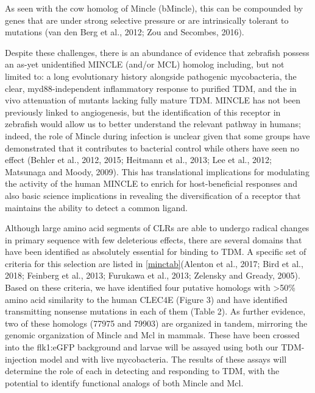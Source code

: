 As seen with the cow homolog of Mincle (bMincle), this can be compounded by genes that are under strong selective pressure or are intrinsically tolerant to mutations (van den Berg et al., 2012; Zou and Secombes, 2016). 

Despite these challenges, there is an abundance of evidence that zebrafish possess an as-yet unidentified MINCLE (and/or MCL) homolog including, but not limited to: a long evolutionary history alongside pathogenic mycobacteria, the clear, myd88-independent inflammatory response to purified TDM, and the in vivo attenuation of mutants lacking fully mature TDM. MINCLE has not been previously linked to angiogenesis, but the identification of this receptor in zebrafish would allow us to better understand the relevant pathway in humans; indeed, the role of Mincle during infection is unclear given that some groups have demonstrated that it contributes to bacterial control while others have seen no effect (Behler et al., 2012, 2015; Heitmann et al., 2013; Lee et al., 2012; Matsunaga and Moody, 2009). This has translational implications for modulating the activity of the human MINCLE to enrich for host-beneficial responses and also basic science implications in revealing the diversification of a receptor that maintains the ability to detect a common ligand. 

Although large amino acid segments of CLRs are able to undergo radical changes in primary sequence with few deleterious effects, there are several domains that have been identified as absolutely essential for binding to TDM. A specific set of criteria for this selection are listed in \autoref{minctab}(Alenton et al., 2017; Bird et al., 2018; Feinberg et al., 2013; Furukawa et al., 2013; Zelensky and Gready, 2005). Based on these criteria, we have identified four putative homologs with >50\% amino acid similarity to the human CLEC4E (Figure 3) and have identified transmitting nonsense mutations in each of them (Table 2). As further evidence, two of these homologs (77975 and 79903) are organized in tandem, mirroring the genomic organization of Mincle and Mcl in mammals. These have been crossed into the flk1:eGFP background and larvae will be assayed using both our TDM-injection model and with live mycobacteria. The results of these assays will determine the role of each in detecting and responding to TDM, with the potential to identify functional analogs of both Mincle and Mcl. 

